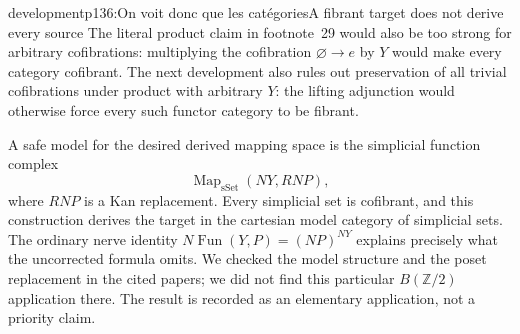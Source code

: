 \begin{dcomment}{development}{p136:On voit donc que les catégories}{A fibrant target does not derive every source}
The literal product claim in footnote~29 would also be too strong for arbitrary cofibrations: multiplying the cofibration $\varnothing\to e$ by $Y$ would make every category cofibrant. The next development also rules out preservation of all trivial cofibrations under product with arbitrary $Y$: the lifting adjunction would otherwise force every such functor category to be fibrant.

A safe model for the desired derived mapping space is the simplicial function complex
\[
              \operatorname{Map}_{\mathrm{sSet}}(NY,RNP),
\]
where $RNP$ is a Kan replacement. Every simplicial set is cofibrant, and this construction derives the target in the cartesian model category of simplicial sets. The ordinary nerve identity
$N\operatorname{Fun}(Y,P)=(NP)^{NY}$ explains precisely what the uncorrected formula omits. We checked the model structure and the poset replacement in the cited papers; we did not find this particular $B(\mathbb Z/2)$ application there. The result is recorded as an elementary application, not a priority claim.
\end{dcomment}

